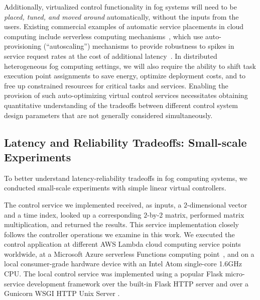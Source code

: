 \documentclass[10pt, journal, letterpaper]{IEEEtran}
\newcommand{\1}{\ensuremath{\mathbf{1}}} %
\begin{document}

\par 
Additionally, virtualized control functionality in fog systems will need to be \emph{placed, tuned, and moved around} automatically, without the inputs from the users. Existing commercial examples of automatic service placements in cloud computing include serverless computing mechanisms~\cite{GoogleCloudFunctions,AmazonLambda,AzureFunctions,OpenWhisk}, which use auto-provisioning (``autoscaling'') mechanisms to provide robustness to spikes in service request rates at the cost of additional latency~\cite{FowlerServerless}. In distributed heterogeneous fog computing settings, we will also require the ability to shift task execution point assignments to save energy, optimize deployment costs, and to free up constrained resources for critical tasks and services. Enabling the provision of such auto-optimizing virtual control services necessitates obtaining quantitative understanding of the tradeoffs between different control system design parameters that are not generally considered simultaneously.

\subsection{Latency and Reliability Tradeoffs: Small-scale Experiments}

\par
To better understand latency-reliability tradeoffs in fog computing systems, we conducted small-scale experiments with simple linear virtual controllers. 

\par 
The control service we implemented received, as inputs, a $2$-dimensional vector and a time index, looked up a corresponding $2$-by-$2$ matrix, performed matrix multiplication, and returned the results. This service implementation closely follows the controller operations we examine in this work. We executed the control application at different AWS Lambda \cite{AmazonLambda} cloud computing service points worldwide, at a Microsoft Azure serverless Functions computing point~\cite{AzureFunctions}, and on a local consumer-grade hardware device with an Intel Atom single-core 1.6GHz CPU. The local control service was implemented using a popular Flask \cite{FlaskFramework}
micro-service development framework over the built-in Flask HTTP server and over a Gunicorn WSGI HTTP Unix Server \cite{Gunicorn2017}.
\end{document}
